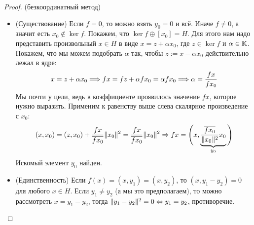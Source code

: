 \begin{proof} (безкоординатный метод)
	\begin{itemize}
		\item (Существование) Если $f = 0$, то можно взять $y_0 = 0$ и всё. Иначе $f \neq 0$, а значит есть $x_0 \notin \ker f$. Покажем, что $\ker f \oplus [x_0] = H$. Для этого нам надо представить произвольный $x \in H$ в виде $x = z + \alpha x_0$, где $z \in \ker f$ и $\alpha \in \mathbb{K}$. Покажем, что мы можем подобрать $\alpha$ так, чтобы $z := x - \alpha x_0$ действительно лежал в ядре:
		\[
			x = z + \alpha x_0 \Longrightarrow fx = fz + \alpha fx_0 = \alpha fx_0 \Longrightarrow \alpha = \frac{fx}{fx_0}
		\]
		Мы почти у цели, ведь в коэффициенте проявилось значение $fx$, которое нужно выразить. Применим к равенству выше слева скалярное произведение с $x_0$:
		\[
			(x, x_0) = (z, x_0) + \frac{fx}{\overline{fx_0}} \|x_0\|^2 = \frac{fx}{\overline{fx_0}} \|x_0\|^2 \Rightarrow fx = \Bigg(x, \underbrace{\frac{\overline{fx_0}}{\|x_0\|^2} x_0}_{y_0}\Bigg)
		\]
		Искомый элемент $y_0$ найден.
		
		\item (Единственность) Если $f(x) = (x, y_1) = (x, y_2)$, то $(x, y_1 - y_2) = 0$ для любого $x \in H$. Если $y_1 \neq y_2$ (а мы это предполагаем), то можно рассмотреть $x = y_1 - y_2$, тогда $\|y_1 - y_2\|^2 = 0 \Leftrightarrow y_1 = y_2$, противоречие.
	\end{itemize}
\end{proof}

